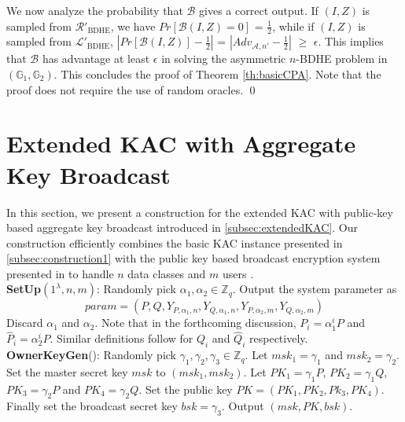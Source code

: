 \noindent We now analyze the probability that $\mathcal{B}$ gives a correct output. If $(I,Z)$ is sampled from ${\mathcal{R}'}_{\text{BDHE}}$, we have $Pr[\mathcal{B}(I,Z)=0]$ = $\frac{1}{2}$, while if $(I,Z)$ is sampled from ${\mathcal{L}'}_{\text{BDHE}}$, $|Pr[\mathcal{B}(I,Z)]-\frac{1}{2}|$ = $|Adv_{\mathcal{A},n'}-\frac{1}{2}|$ $\geq$ $\epsilon$. This implies that $\mathcal{B}$ has advantage at least $\epsilon$ in solving the asymmetric $n$-BDHE problem in $(\mathbb{G}_1,\mathbb{G}_2)$. This concludes the proof of Theorem \ref{th:basicCPA}. Note that the proof does not require the use of random oracles. \hfill\qed




\section{Extended KAC with Aggregate Key Broadcast}
\label{sec:extendedconstruction}

In this section, we present a construction for the extended KAC with public-key based aggregate key broadcast introduced in \ref{subsec:extendedKAC}. Our construction efficiently combines the basic KAC instance presented in \ref{subsec:construction1} with the public key based broadcast encryption system presented in \cite{boneh2005collusion} to handle $n$ data classes and $m$ users .\\

 \noindent \textbf{SetUp}$(1^{\lambda},n,m)$: Randomly pick $\alpha_1,\alpha_2 \in \mathbb{Z}_q$. Output the system parameter as 
 \begin{equation}
  param = (P,Q,Y_{P,\alpha_1,n},Y_{Q,\alpha_1,n},Y_{P,\alpha_2,m},Y_{Q,\alpha_2,m}) \nonumber
 \end{equation}
 \noindent Discard $\alpha_1$ and $\alpha_2$. Note that in the forthcoming discussion, $P_i={\alpha^i_1} P$ and $\hat{P}_i={\alpha^i_2} P$. Similar definitions follow for $Q_i$ and $\hat{Q}_i$ respectively.\\
 
 \noindent \textbf{OwnerKeyGen}(): Randomly pick $\gamma_1,\gamma_2,\gamma_3\in \mathbb{Z}_q$. Let $msk_1=\gamma_1$ and $msk_2=\gamma_2$. Set the master secret key $msk$ to $(msk_1,msk_2)$. Let $PK_1=\gamma_1 P$, $PK_2=\gamma_1 Q$, $PK_3=\gamma_2 P$ and $PK_4=\gamma_2 Q$. Set the public key $PK=(PK_1,PK_2,Pk_3,PK_4)$. Finally set the broadcast secret key $bsk=\gamma_3$. Output $(msk,PK,bsk)$.\\
 
